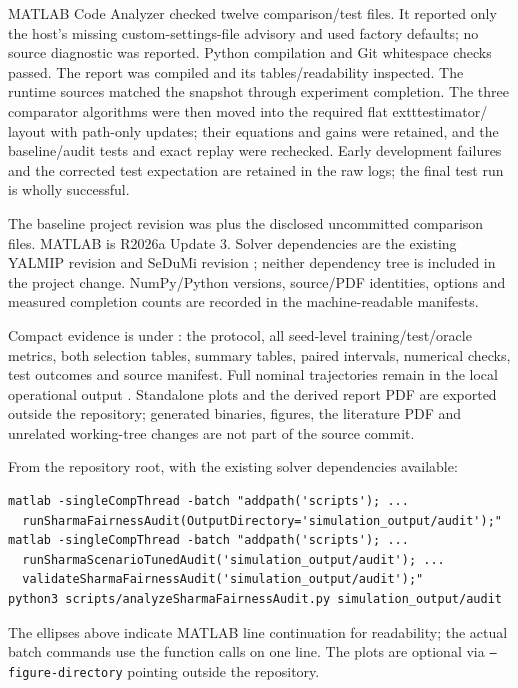 \documentclass[11pt]{article}
\begin{document}
MATLAB Code Analyzer checked twelve comparison/test files. It reported only
the host's missing custom-settings-file advisory and used factory defaults;
no source diagnostic was reported. Python compilation and Git whitespace
checks passed. The report was compiled and its tables/readability inspected.
The runtime sources matched the snapshot through experiment completion.
The three comparator algorithms were then moved into the required flat
	exttt{estimator/} layout with path-only updates; their equations and gains
were retained, and the baseline/audit tests and exact replay were rechecked.
Early development failures and the corrected test expectation are retained
in the raw logs; the final test run is wholly successful.

The baseline project revision was
 plus the disclosed uncommitted
comparison files. MATLAB is R2026a Update 3. Solver dependencies are the
existing YALMIP revision 
and SeDuMi revision ; neither
dependency tree is included in the project change. NumPy/Python versions,
source/PDF identities, options and measured completion counts are recorded
in the machine-readable manifests.

Compact evidence is under
: the protocol, all seed-level
training/test/oracle metrics, both selection tables, summary tables, paired
intervals, numerical checks, test outcomes and source manifest. Full nominal
trajectories remain in the local operational output
.
Standalone plots and the derived report PDF are exported outside the
repository; generated binaries, figures, the literature PDF and unrelated
working-tree changes are not part of the source commit.

From the repository root, with the existing solver dependencies available:
\begin{verbatim}
matlab -singleCompThread -batch "addpath('scripts'); ...
  runSharmaFairnessAudit(OutputDirectory='simulation_output/audit');"
matlab -singleCompThread -batch "addpath('scripts'); ...
  runSharmaScenarioTunedAudit('simulation_output/audit'); ...
  validateSharmaFairnessAudit('simulation_output/audit');"
python3 scripts/analyzeSharmaFairnessAudit.py simulation_output/audit
\end{verbatim}
The ellipses above indicate MATLAB line continuation for readability; the
actual batch commands use the function calls on one line. The plots are
optional via \texttt{--figure-directory} pointing outside the repository.
\end{document}
